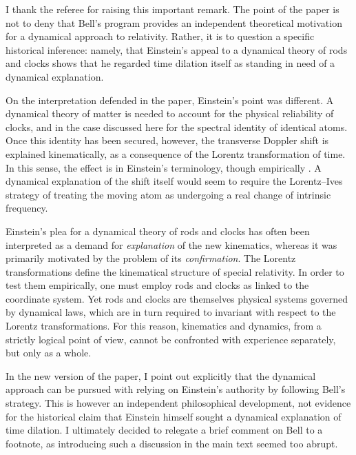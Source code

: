 \documentclass[submitted,11pt]{article}
\begin{document}
\begin{reply}
I thank the referee for raising this important remark. The point of the paper is not to deny that Bell’s program provides an independent theoretical motivation for a dynamical approach to relativity. Rather, it is to question a specific historical inference: namely, that Einstein’s appeal to a dynamical theory of rods and clocks shows that he regarded time dilation itself as standing in need of a dynamical explanation. 

On the interpretation defended in the paper, Einstein’s point was different. A dynamical theory of matter is needed to account for the physical reliability of clocks, and in the case discussed here for the spectral identity of identical atoms. Once this identity has been secured, however, the transverse Doppler shift is explained kinematically, as a consequence of the Lorentz transformation of time. In this sense, the effect is  in Einstein’s terminology, though empirically . A dynamical explanation of the shift itself would seem to require the Lorentz--Ives strategy of treating the moving atom as undergoing a real change of intrinsic frequency. 


Einstein’s plea for a dynamical theory of rods and clocks has often been interpreted as a demand for \emph{explanation} of the new kinematics, whereas it was primarily motivated by the problem of its \emph{confirmation}. The Lorentz transformations define the kinematical structure of special relativity. In order to test them empirically, one must employ rods and clocks as linked to the coordinate system. Yet rods and clocks are themselves physical systems governed by dynamical laws, which are in turn required to invariant with respect to the Lorentz transformations. For this reason, kinematics and dynamics, from a strictly logical point of view, cannot be confronted with experience separately, but only as a whole.


In the new version of the paper, I point out explicitly that the dynamical approach can be pursued with relying on Einstein's authority by following Bell’s strategy. This is however an independent philosophical development, not evidence for the historical claim that Einstein himself sought a dynamical explanation of time dilation. I ultimately decided to relegate a brief comment on Bell to a footnote, as introducing such a discussion in the main text seemed too abrupt.


\end{reply}
\end{document}
